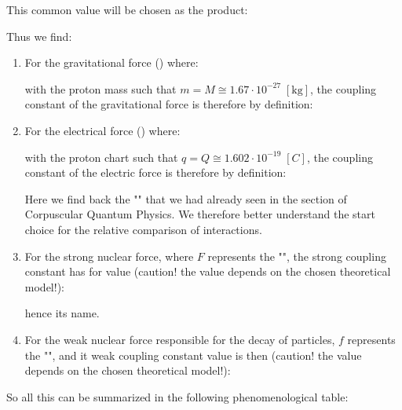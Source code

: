 	This common value will be chosen as the product:
	
	Thus we find:
	\begin{enumerate}
		\item For the gravitational force () where:
		
		with the proton mass such that $m=M\cong 1.67\cdot 10^{-27}\; [\text{kg}]$, the coupling constant of the gravitational force is therefore by definition:
		
		\item For the electrical force () where:
		
		with the proton chart such that $q=Q\cong 1.602\cdot 10^{-19}\; [C]$, the coupling constant of the electric force is therefore by definition:
		
		\begin{tcolorbox}[title=Remark,colframe=black,arc=10pt]
		Here we find back the "" that we had already seen in the section of Corpuscular Quantum Physics. We therefore better understand the start choice for the relative comparison of interactions.
		\end{tcolorbox}
		\item For the strong nuclear force, where $F$ represents the "", the strong coupling constant has for value (caution! the value depends on the chosen theoretical model!):
		
		hence its name.
		\item For the weak nuclear force responsible for the decay of particles, $f$ represents the "", and it weak coupling constant value is then (caution! the value depends on the chosen theoretical model!):
		
	\end{enumerate}
	 So all this can be summarized in the following phenomenological table: 
	 
